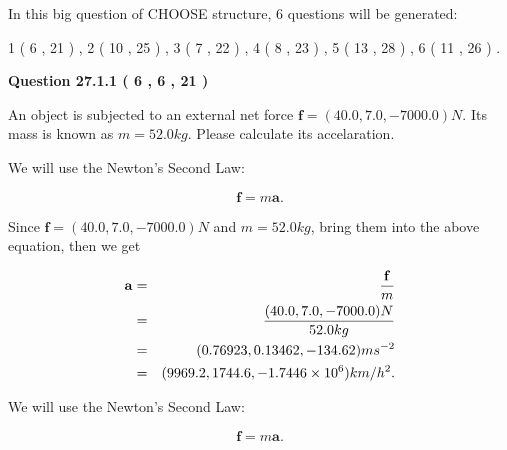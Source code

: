 \documentclass[12pt]{article}
\begin{document}
   
\vspace{0.2in}
   
 In this big question of CHOOSE structure,            6  questions will be generated: 
  
  
             1 (           6 ,          21 )
 ,
             2 (          10 ,          25 )
 ,
             3 (           7 ,          22 )
 ,
             4 (           8 ,          23 )
 ,
             5 (          13 ,          28 )
 ,
             6 (          11 ,          26 )
 .
  
\vspace{0.2in}
  
{\textbf{\Large{Question
27.1.1 
 (           6 ,           6 ,          21 )
}}}
  
  
 
An object is subjected to an external net force $\mathbf{f}=(
40.0,  %
7.0,
-7000.0  )N$. Its mass is known as
$m= %
52.0 kg$. Please calculate its accelaration.
 
 
 
 
\noindent{}
 
 

We will use the Newton's Second Law:
 
\[
\mathbf{f}=m\mathbf{a}.
\]
 
Since $\mathbf{f}=( %
40.0,  %
7.0,  %
-7000.0 )N$
and $m= %
52.0 kg$, bring them into the above equation, then we get
 
\begin{eqnarray*}
\mathbf{a}&=&\frac{\mathbf{f}}m  \\
&=&\frac{(
40.0 ,
7.0 ,
-7000.0 )N
}{ %
52.0 kg}  \\
&=&(
0.76923 ,
0.13462,
-134.62
)ms^{-2} \\
&=&(
9969.2 ,
1744.6 ,
-1.7446 \times 10^{6}
)km/h^2.
\end{eqnarray*}
 
 
 
\noindent{}
 
 

 
 
 
\noindent{}
 
 

We will use the Newton's Second Law:
 
\[
\mathbf{f}=m\mathbf{a}.
\]
 
\end{document}

